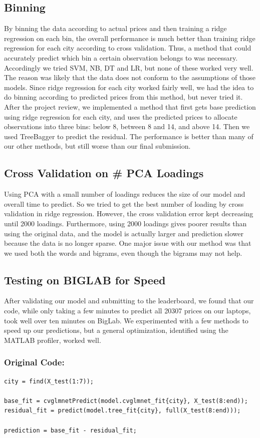 \documentclass[11pt]{article}
\begin{document}
\subsection{Binning}
By binning the data according to actual prices and then training a ridge regression on each bin, the overall performance is much better than training ridge regression for each city according to cross validation. Thus, a method that could accurately predict which bin a certain observation belongs to was necessary. Accordingly we tried SVM, NB, DT and LR, but none of these worked very well. The reason was likely that the data does not conform to the assumptions of those models. Since ridge regression for each city worked fairly well, we had the idea to do binning according to predicted prices from this method, but never tried it. After the project review, we implemented a method that first gets base prediction using ridge regression for each city, and uses the predicted prices to allocate observations into three bins: below 8, between 8 and 14, and above 14. Then we used TreeBagger to predict the residual. The performance is better than many of our other methods, but still worse than our final submission.

\subsection{Cross Validation on \# PCA Loadings}
Using PCA with a small number of loadings reduces the size of our model and overall time to predict. So we tried to get the best number of loading by cross validation in ridge regression. However, the cross validation error kept decreasing until 2000 loadings. Furthermore, using 2000 loadings gives poorer results than using the original data, and the model is actually larger and prediction slower because the data is no longer sparse. One major issue with our method was that we used both the words and bigrams, even though the bigrams may not help.

\subsection{Testing on BIGLAB for Speed}
After validating our model and submitting to the leaderboard, we found that our code, while only taking a few minutes to predict all 20307 prices on our laptops, took well over ten minutes on BigLab. We experimented with a few methods to speed up our predictions, but a general optimization, identified using the MATLAB profiler, worked well.
\subsubsection*{Original Code:}
\begin{lstlisting}
city = find(X_test(1:7));

base_fit = cvglmnetPredict(model.cvglmnet_fit{city}, X_test(8:end));
residual_fit = predict(model.tree_fit{city}, full(X_test(8:end)));

prediction = base_fit - residual_fit;
\end{lstlisting}
\end{document}
